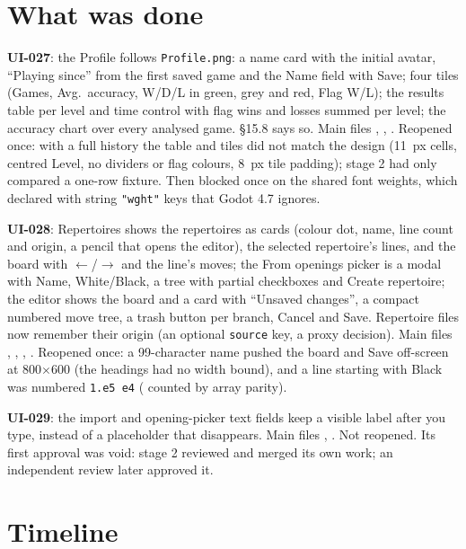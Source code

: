 \documentclass[11pt,a4paper]{article}
\begin{document}
\section*{What was done}

\textbf{UI-027}: the Profile follows \texttt{Profile.png}: a name card with the initial avatar,
``Playing since'' from the first saved game and the Name field with Save; four tiles (Games,
Avg.\ accuracy, W/D/L in green, grey and red, Flag W/L); the results table per level and time
control with flag wins and losses summed per level; the accuracy chart over every analysed game.
 §15.8 says so. Main files , ,
. Reopened once: with a full history the table and tiles did not match
the design (11~px cells, centred Level, no dividers or flag colours, 8~px tile padding); stage 2
had only compared a one-row fixture. Then blocked once on the shared font weights, which
 declared with string \texttt{"wght"} keys that Godot 4.7 ignores.

\textbf{UI-028}: Repertoires shows the repertoires as cards (colour dot, name, line count and
origin, a pencil that opens the editor), the selected repertoire's lines, and the board with
$\leftarrow$/$\rightarrow$ and the line's moves; the From openings picker is a modal with Name,
White/Black, a tree with partial checkboxes and Create repertoire; the editor shows the board and a
card with ``Unsaved changes'', a compact numbered move tree, a trash button per branch, Cancel and
Save. Repertoire files now remember their origin (an optional \texttt{source} key, a proxy
decision). Main files , ,
, . Reopened once: a 99-character name
pushed the board and Save off-screen at 800$\times$600 (the headings had no width bound), and a
line starting with Black was numbered \texttt{1.e5 e4} ( counted by
array parity).

\textbf{UI-029}: the import and opening-picker text fields keep a visible label after you type,
instead of a placeholder that disappears. Main files ,
. Not reopened. Its first approval was void: stage 2 reviewed and
merged its own work; an independent review later approved it.

\section*{Timeline}
\end{document}
